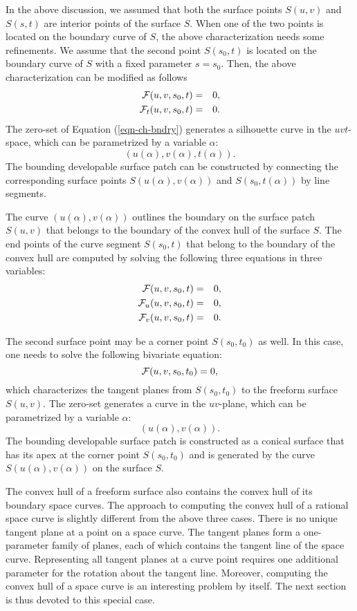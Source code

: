 \documentclass[11pt]{article}          %
\begin{document}
In the above discussion, we assumed that both the surface points
$S(u,v)$ and $S(s,t)$ are interior points of the surface $S$.
When one of the two points is located on the boundary curve of $S$,
the above characterization needs some refinements.
We assume that the second point $S(s_0,t)$ is located
on the boundary curve of $S$ with a fixed parameter $s=s_0$.
Then, the above characterization can be modified as follows
\begin{eqnarray}
   {\cal F}(u,v,s_0,t) &=& 0, \label{eqn-ch-bndry}\\
   {\cal F}_t(u,v,s_0,t) &=& 0. \nonumber
\end{eqnarray}
The zero-set of Equation (\ref{eqn-ch-bndry}) generates a silhouette curve 
in the $uvt$-space, which can be parametrized by a variable $\alpha$:
\[
   (u(\alpha),v(\alpha),t(\alpha)).
\]
The bounding developable surface patch can be constructed
by connecting the corresponding surface points
$S(u(\alpha),v(\alpha))$ and $S(s_0,t(\alpha))$ by line segments.

The curve $(u(\alpha),v(\alpha))$ outlines the boundary
on the surface patch $S(u,v)$ that belongs to the boundary of
the convex hull of the surface $S$.  The end points of
the curve segment $S(s_0,t)$ that belong to the boundary
of the convex hull are computed by solving the following
three equations in three variables:
\begin{eqnarray*}
   {\cal F}(u,v,s_0,t) &=& 0,\\
   {\cal F}_u(u,v,s_0,t) &=& 0,\\
   {\cal F}_v(u,v,s_0,t) &=& 0.
\end{eqnarray*}

The second surface point may be a corner point $S(s_0,t_0)$ as well.
In this case, one needs to solve the following bivariate equation:
\[
   {\cal F}(u,v,s_0,t_0) = 0,
\]
which characterizes the tangent planes from $S(s_0,t_0)$
to the freeform surface $S(u,v)$.
The zero-set generates a curve in the $uv$-plane,
which can be parametrized by a variable $\alpha$:
\[
   (u(\alpha),v(\alpha)).
\]
The bounding developable surface patch is constructed
as a conical surface that has its apex at the corner point
$S(s_0,t_0)$ and is generated by the curve
$S(u(\alpha),v(\alpha))$ on the surface $S$.

The convex hull of a freeform surface also contains
the convex hull of its boundary space curves.
The approach to computing the convex hull of a rational space curve
is slightly different from the above three cases.
There is no unique tangent plane at a point on a space curve.
The tangent planes form a one-parameter family of planes,
each of which contains the tangent line of the space curve.
Representing all tangent planes at a curve point requires
one additional parameter for the rotation about the tangent line.
Moreover, computing the convex hull of a space curve is 
an interesting problem by itself.
The next section is thus devoted to this special case.
\end{document}
